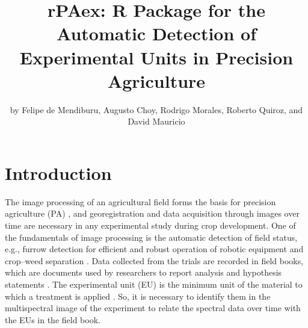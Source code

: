 \title{rPAex: R Package for the Automatic Detection of Experimental Units in Precision Agriculture}


\author{by Felipe de Mendiburu, Augusto Choy, Rodrigo Morales, Roberto Quiroz, and David Mauricio}

\maketitle


\section{Introduction}\label{introduction}

The image processing of an agricultural field forms the basis for precision agriculture (PA) \citep{srinivasan2006handbook}, and georegistration and data acquisition through images over time are necessary in any experimental study during crop development. One of the fundamentals of image processing is the automatic detection of field status, e.g., furrow detection for efficient and robust operation of robotic equipment \citep{utstumo2018robotic} and crop--weed separation \citep{montalvo2012automatic}. Data collected from the trials are recorded in field books, which are documents used by researchers to report analysis and hypothesis statements \citep{tripp1982data}. The experimental unit (EU) is the minimum unit of the material to which a treatment is applied \citep{bailey2008design}. So, it is necessary to identify them in the multispectral image of the experiment to relate the spectral data over time with the EUs in the field book.

